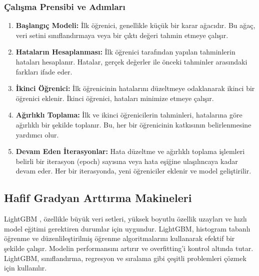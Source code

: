 \subsubsection{Çalışma Prensibi ve Adımları}
\begin{enumerate}
\item \textbf{Başlangıç Modeli:} İlk öğrenici, genellikle küçük bir karar ağacıdır. Bu ağaç, veri setini sınıflandırmaya veya bir çıktı değeri tahmin etmeye çalışır.
\item \textbf{Hataların Hesaplanması:} İlk öğrenici tarafından yapılan tahminlerin hataları hesaplanır. Hatalar, gerçek değerler ile önceki tahminler arasındaki farkları ifade eder.
\item \textbf{İkinci Öğrenici:} İlk öğrenicinin hatalarını düzeltmeye odaklanarak ikinci bir öğrenici eklenir. İkinci öğrenici, hataları minimize etmeye çalışır.
\item \textbf{Ağırlıklı Toplama:} İlk ve ikinci öğrenicilerin tahminleri, hatalarına göre ağırlıklı bir şekilde toplanır. Bu, her bir öğrenicinin katkısının belirlenmesine yardımcı olur.
\item \textbf{Devam Eden İterasyonlar:} Hata düzeltme ve ağırlıklı toplama işlemleri belirli bir iterasyon (epoch) sayısına veya hata eşiğine ulaşılıncaya kadar devam eder. Her bir iterasyonda, yeni öğreniciler eklenir ve model geliştirilir.
\end{enumerate}

\subsection{Hafif Gradyan Arttırma Makineleri}
LightGBM , özellikle büyük veri setleri, yüksek boyutlu özellik uzayları ve hızlı model eğitimi gerektiren durumlar için uygundur. LightGBM, histogram tabanlı öğrenme ve düzenlileştirilmiş öğrenme algoritmalarını kullanarak efektif bir şekilde çalışır. Modelin performansını artırır ve overfitting'i kontrol altında tutar. LightGBM, sınıflandırma, regresyon ve sıralama gibi çeşitli problemleri çözmek için kullanılır. 

